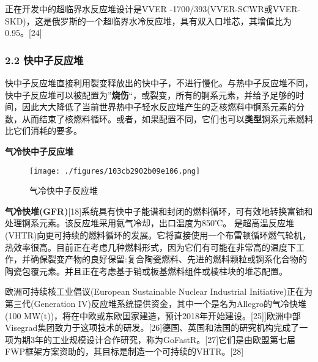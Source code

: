 正在开发中的超临界水反应堆设计是VVER -1700/393(VVER-SCWR或VVER-SKD)，这是俄罗斯的一个超临界水冷反应堆，具有双入口堆芯，其增值比为0.95。[24]

\subsubsection{2.2 快中子反应堆}
快中子反应堆直接利用裂变释放出的快中子，不进行慢化。与热中子反应堆不同，快中子反应堆可以被配置为”\textbf{烧伤}“，或裂变，所有的锕系元素，并给予足够的时间，因此大大降低了当前世界热中子轻水反应堆产生的乏核燃料中锕系元素的分数，从而结束了核燃料循环。或者，如果配置不同，它们也可以\textbf{类型}锕系元素燃料比它们消耗的要多。

\textbf{气冷快中子反应堆}

\begin{figure}[ht]
\centering
\texttt{[image: ./figures/103cb2902b09e106.png]}
\caption{气冷快中子反应堆} \label{fig_FYD_4}
\end{figure}

\textbf{气冷快堆(GFR)}[18]系统具有快中子能谱和封闭的燃料循环，可有效地转换富铀和处理锕系元素。该反应堆采用氦气冷却，出口温度为850℃。 是超高温反应堆(VHTR)向更可持续的燃料循环的发展。它将直接使用一个布雷顿循环燃气轮机，热效率很高。目前正在考虑几种燃料形式，因为它们有可能在非常高的温度下工作，并确保裂变产物的良好保留:复合陶瓷燃料、先进的燃料颗粒或锕系化合物的陶瓷包覆元素。并且正在考虑基于销或板基燃料组件或棱柱块的堆芯配置。

欧洲可持续核工业倡议(European Sustainable Nuclear Industrial Initiative)正在为第三代(Generation IV)反应堆系统提供资金，其中一个是名为Allegro的气冷快堆(100 MW(t))，将在中欧或东欧国家建造，预计2018年开始建设。[25]]欧洲中部Visegrad集团致力于这项技术的研发。[26]德国、英国和法国的研究机构完成了一项为期3年的工业规模设计合作研究，称为GoFastR。[27]它们是由欧盟第七届FWP框架方案资助的，其目标是制造一个可持续的VHTR。[28]
